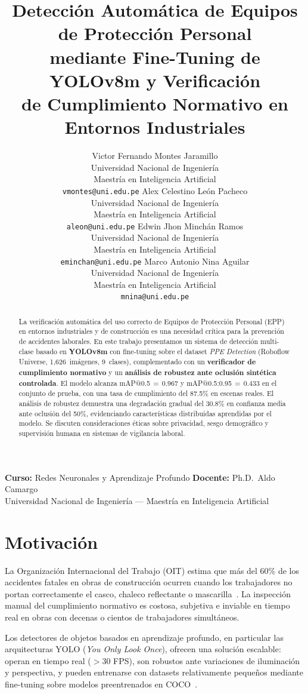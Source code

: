 \documentclass{article}
\title{Detección Automática de Equipos de Protección Personal\\
       mediante Fine-Tuning de YOLOv8m y Verificación\\
       de Cumplimiento Normativo en Entornos Industriales}
\author{%
  Victor Fernando Montes Jaramillo \\
  Universidad Nacional de Ingeniería \\
  Maestría en Inteligencia Artificial \\
  \texttt{vmontes@uni.edu.pe}
  \And
  Alex Celestino León Pacheco \\
  Universidad Nacional de Ingeniería \\
  Maestría en Inteligencia Artificial \\
  \texttt{aleon@uni.edu.pe}
  \And
  Edwin Jhon Minchán Ramos \\
  Universidad Nacional de Ingeniería \\
  Maestría en Inteligencia Artificial \\
  \texttt{eminchan@uni.edu.pe}
  \AND
  Marco Antonio Nina Aguilar \\
  Universidad Nacional de Ingeniería \\
  Maestría en Inteligencia Artificial \\
  \texttt{mnina@uni.edu.pe}
}
\begin{document}
\maketitle

\begin{center}
  \small
  \textbf{Curso:} Redes Neuronales y Aprendizaje Profundo \quad
  \textbf{Docente:} Ph.D.\ Aldo Camargo \\
  Universidad Nacional de Ingeniería --- Maestría en Inteligencia Artificial
\end{center}
\vspace{0.5em}

\begin{abstract}
La verificación automática del uso correcto de Equipos de Protección
Personal (EPP) en entornos industriales y de construcción es una necesidad
crítica para la prevención de accidentes laborales. En este trabajo
presentamos un sistema de detección multi-clase basado en
\textbf{YOLOv8m} con fine-tuning sobre el dataset
\emph{PPE Detection} (Roboflow Universe, 1{,}626~imágenes, 9~clases),
complementado con un \textbf{verificador de cumplimiento normativo} y
un \textbf{análisis de robustez ante oclusión sintética controlada}.
El modelo alcanza mAP@0.5\,$=\,0.967$ y mAP@0.5:0.95\,$=\,0.433$ en
el conjunto de prueba, con una tasa de cumplimiento del 87.5\% en
escenas reales. El análisis de robustez demuestra una degradación
gradual del 30.8\% en confianza media ante oclusión del 50\%,
evidenciando características distribuidas aprendidas por el modelo.
Se discuten consideraciones éticas sobre privacidad, sesgo demográfico
y supervisión humana en sistemas de vigilancia laboral.
\end{abstract}

\section{Motivación}
\label{sec:motivation}

La Organización Internacional del Trabajo (OIT) estima que más del
60\% de los accidentes fatales en obras de construcción ocurren cuando
los trabajadores no portan correctamente el casco, chaleco reflectante
o mascarilla~\cite{oit2023}. La inspección manual del cumplimiento
normativo es costosa, subjetiva e inviable en tiempo real en obras con
decenas o cientos de trabajadores simultáneos.

Los detectores de objetos basados en aprendizaje profundo, en particular
las arquitecturas YOLO (\emph{You Only Look Once}), ofrecen una solución
escalable: operan en tiempo real ($>$30 FPS), son robustos ante
variaciones de iluminación y perspectiva, y pueden entrenarse con
datasets relativamente pequeños mediante fine-tuning sobre modelos
preentrenados en COCO~\cite{lin2014microsoft}.
\end{document}
